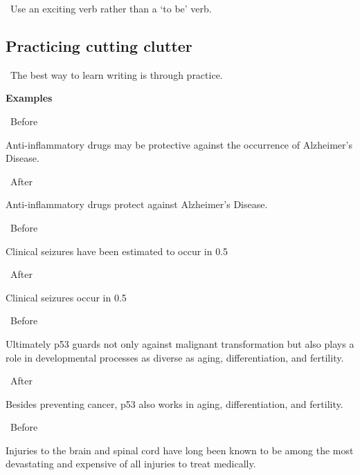 \documentclass[a4paper, 12pt]{article}
\begin{document}
\vspace{4pt}\par\textbullet\ Use an exciting verb rather than a `to be' verb.

\newpage\subsection{Practicing cutting clutter}

\vspace{4pt}\par\textbullet\ The best way to learn writing is through practice.

\vspace{4pt}\par\textbf{Examples}

\vspace{4pt}\par\textbullet\ Before
\par Anti-inflammatory drugs may be protective against the occurrence of Alzheimer’s Disease.

\vspace{4pt}\par\textbullet\ After
\par Anti-inflammatory drugs protect against Alzheimer’s Disease.

\vspace{4pt}\par\textbullet\ Before
\par Clinical seizures have been estimated to occur in 0.5%

\vspace{4pt}\par\textbullet\ After
\par Clinical seizures occur in 0.5%

\vspace{4pt}\par\textbullet\ Before
\par Ultimately p53 guards not only against malignant transformation but also plays a role in developmental processes as diverse as aging, differentiation, and fertility.

\vspace{4pt}\par\textbullet\ After
\par Besides preventing cancer, p53 also works in aging, differentiation, and fertility.

\vspace{4pt}\par\textbullet\ Before
\par Injuries to the brain and spinal cord have long been known to be among the most devastating and expensive of all injuries to treat medically.
\end{document}
